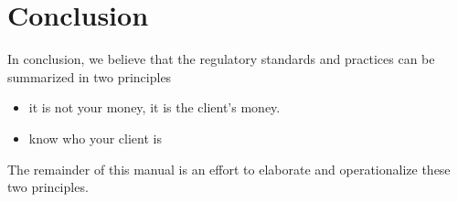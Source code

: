 \section{Conclusion}
In conclusion, we believe that the regulatory standards and practices
can be summarized in two principles

\begin{itemize}
\item it is not your money, it is the client's money.
\item know who your client is
\end{itemize}

The remainder of this manual is an effort to elaborate and
operationalize these two principles.

